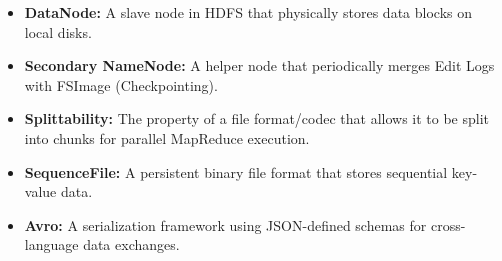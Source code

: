 \documentclass[12pt,a4paper]{article}
\begin{document}
\begin{tcolorbox}[defbox, title={\textbf{One-Line Definitions}}]
\begin{itemize}[leftmargin=*, itemsep=3pt, topsep=0pt]
  \item \textbf{DataNode:} A slave node in HDFS that physically stores data blocks on local disks.
  \item \textbf{Secondary NameNode:} A helper node that periodically merges Edit Logs with FSImage (Checkpointing).
  \item \textbf{Splittability:} The property of a file format/codec that allows it to be split into chunks for parallel MapReduce execution.
  \item \textbf{SequenceFile:} A persistent binary file format that stores sequential key-value data.
  \item \textbf{Avro:} A serialization framework using JSON-defined schemas for cross-language data exchanges.
\end{itemize}
\end{tcolorbox}

\vspace{6pt}
\end{document}
